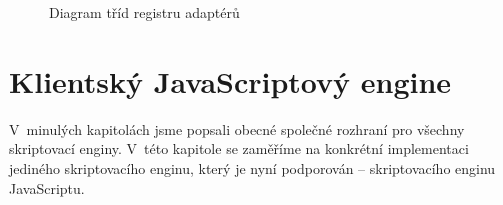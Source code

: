 \begin{figure}[H]
  \begin{center}
    \caption{Diagram tříd registru adaptérů}
    \label{Figure.AdapterRegistry}
  \end{center}
\end{figure}

\vspace{-1em}

\section{Klientský JavaScriptový engine}
\label{Chapter.Implementation.JavaScriptEngine}

V~minulých kapitolách jsme popsali obecné společné rozhraní pro všechny skriptovací enginy. V~této kapitole se zaměříme na konkrétní implementaci jediného skriptovacího enginu, který je nyní podporován -- skriptovacího enginu JavaScriptu.

